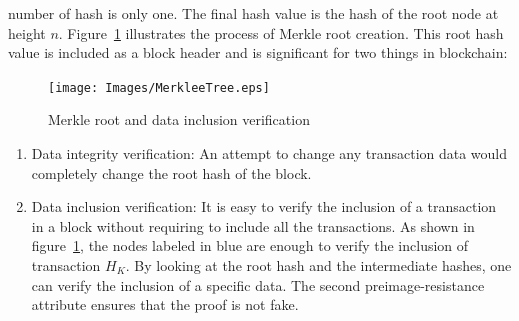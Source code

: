 number of hash is only one. The final hash value is the hash of the root node
at height $n$. Figure~\ref{fig:merkleTree} illustrates the process of Merkle
root creation.
This root hash value is included as a block header and is significant for two
things in blockchain: 
\begin{figure}
	\begin{center}
		\texttt{[image: Images/MerkleeTree.eps]}
		\caption{Merkle root and data inclusion verification}
		\label{fig:merkleTree}
	\end{center}
\end{figure}
\begin{enumerate}
	\item Data integrity verification: An attempt to change any transaction data
		would completely change the root hash of the block.  
	\item Data inclusion verification: It is easy to verify the inclusion of a
		transaction in a block without requiring to include all the
		transactions. As shown in figure~\ref{fig:merkleTree}, the nodes
		labeled in blue are enough to verify the inclusion of transaction
		$H_{K}$. By looking at the root hash and the intermediate hashes, one
		can verify the inclusion of a specific data. The second
		preimage-resistance attribute ensures that the proof is not fake. 
\end{enumerate}

